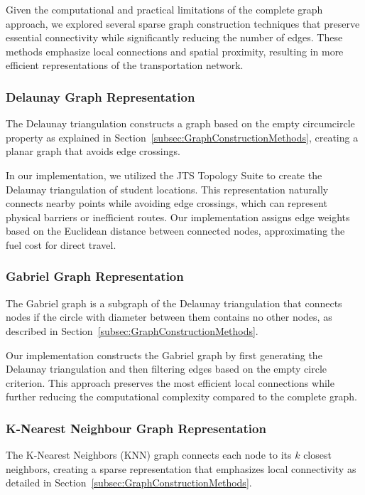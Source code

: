 Given the computational and practical limitations of the complete graph approach, we explored several sparse graph construction techniques that preserve essential connectivity while significantly reducing the number of edges. These methods emphasize local connections and spatial proximity, resulting in more efficient representations of the transportation network.

\subsubsection{Delaunay Graph Representation}
\label{subsubsec:delaunay}

The Delaunay triangulation constructs a graph based on the empty circumcircle property as explained in Section~\ref{subsec:GraphConstructionMethods}, creating a planar graph that avoids edge crossings.

In our implementation, we utilized the JTS Topology Suite to create the Delaunay triangulation of student locations. This representation naturally connects nearby points while avoiding edge crossings, which can represent physical barriers or inefficient routes. Our implementation assigns edge weights based on the Euclidean distance between connected nodes, approximating the fuel cost for direct travel.

\subsubsection{Gabriel Graph Representation}
\label{subsubsec:gabriel}

The Gabriel graph is a subgraph of the Delaunay triangulation that connects nodes if the circle with diameter between them contains no other nodes, as described in Section~\ref{subsec:GraphConstructionMethods}.

Our implementation constructs the Gabriel graph by first generating the Delaunay triangulation and then filtering edges based on the empty circle criterion. This approach preserves the most efficient local connections while further reducing the computational complexity compared to the complete graph.

\subsubsection{K-Nearest Neighbour Graph Representation}
\label{subsubsec:knn}

The K-Nearest Neighbors (KNN) graph connects each node to its $k$ closest neighbors, creating a sparse representation that emphasizes local connectivity as detailed in Section~\ref{subsec:GraphConstructionMethods}.

